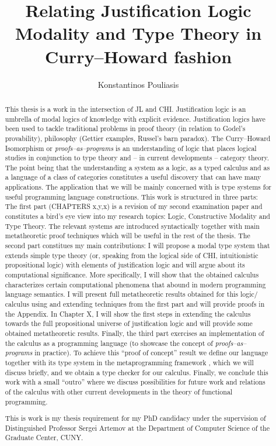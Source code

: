 \documentclass[12pt]{report}
\title{Relating Justification Logic Modality and Type Theory in Curry--Howard fashion}
\author{Konstantinos Pouliasis}
\begin{document}
\maketitle


\begin{abstract}
This thesis is a work in the intersection of \ac{JL} and \ac{CHI}. Justification logic is an umbrella of modal logics of knowledge with explicit evidence. 
Justification logics have been used to tackle traditional problems in proof theory (in relation to Godel's provability), philosophy (Gettier examples, Russel's barn paradox). 
The Curry--Howard Isomorphism or \emph{proofs--as--programs} is an understanding of logic that places logical studies in conjunction to type theory and -- in current developments -- 
category theory. The point being that the  understanding a system as a logic, as a typed calculus and as a language of a class of categories constitutes a useful discovery 
that can have many applications.
The application that we will be mainly concerned with is type systems for useful programming language constructions. 
This work  is structured in three parts: 
The first part (CHAPTERS x,y,x) is a revision of my second examination paper and constitutes a bird's eye view into my research topics:  
Logic, Constructive Modality and Type Theory. 
The relevant systems are introduced syntactically together with main  metatheoretic proof techniques which will be useful in the rest of the thesis.
The second part constitues my main contributions: I will propose  a modal type system that extends simple type theory (or, speaking from the logical side of \ac{CHI}, 
intuitionistic propositional logic) with elements of justification logic and will argue about its computational significance. More specifically, I will show  
that the obtained calculus characterizes  certain computational phenomena that abound in modern programming language semantics. 
I will present full metatheoretic
results obtained for this logic/ calculus using and extending techniques from the first part and will provide proofs in the Appendix. 
In Chapter X, 
I will show the first steps in extending the calculus towards the full propositional universe of justification logic and will provide some obtained metatheoretic results.
Finally, the third part exercises an implementation of the calculus as a programming language (to showcase the concept of \emph{proofs--as--programs} in practice). To achieve this ``proof of concept'' result we define our 
language together with its type system
in the metaprogramming framework , which we will discuss briefly, 
and we obtain a type checker for our calculus. Finally, we conclude this work with a small ``outro'' 
where we discuss possibilities for future work and relations of the calculus with other current developments in the theory 
of functional programming.

This is work is my thesis requirement for my PhD candidacy under the supervision of Distinguished Professor Sergei Artemov at the Department of 
Computer Science of the Graduate Center, CUNY.
\end{abstract}
\end{document}
